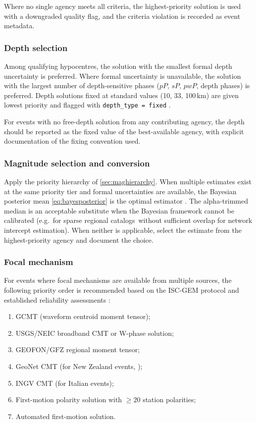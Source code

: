 \documentclass[12pt]{article}
\newcommand{\catalogs}{catalogs}
\begin{document}
Where no single agency meets all criteria, the highest-priority solution is
used with a downgraded quality flag, and the criteria violation is recorded as
event metadata.

\subsubsection{Depth selection}

Among qualifying hypocentres, the solution with the smallest formal depth
uncertainty is preferred.  Where formal uncertainty is unavailable, the
solution with the largest number of depth-sensitive phases ($pP$, $sP$,
$pwP$, depth phases) is preferred.  Depth solutions fixed at standard values
(10, 33, 100\,km) are given lowest priority and flagged with
\texttt{depth\_type = fixed} \citep{Engdahl2020}.

For events with no free-depth solution from any contributing agency, the
depth should be reported as the fixed value of the best-available agency,
with explicit documentation of the fixing convention used.

\subsubsection{Magnitude selection and conversion}

Apply the priority hierarchy of \cref{sec:maghierarchy}.  When multiple
estimates exist at the same priority tier and formal uncertainties are
available, the Bayesian posterior mean \eqref{eq:bayesposterior} is the
optimal estimator \citep{Si2024}.  The alpha-trimmed median
\citep{ISCGEM2018} is an acceptable substitute when the Bayesian framework
cannot be calibrated (e.g.\ for sparse regional \catalogs\ without sufficient
overlap for network intercept estimation).  When neither is applicable,
select the estimate from the highest-priority agency and document the choice.

\subsubsection{Focal mechanism}

For events where focal mechanisms are available from multiple sources, the
following priority order is recommended based on the ISC-GEM protocol and
established reliability assessments \citep{Dziewonski1981, Ekstrom2012}:

\begin{enumerate}
  \item GCMT (waveform centroid moment tensor);
  \item USGS/NEIC broadband CMT or W-phase solution;
  \item GEOFON/GFZ regional moment tensor;
  \item GeoNet CMT (for New Zealand events, \citealt{GeoNetEqCatalogue});
  \item INGV CMT (for Italian events);
  \item First-motion polarity solution with $\geq 20$ station polarities;
  \item Automated first-motion solution.
\end{enumerate}
\end{document}
